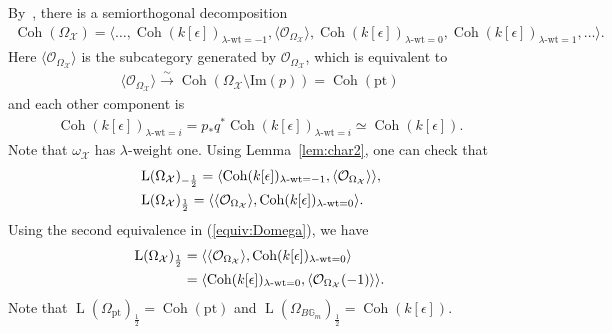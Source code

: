 \documentclass [11pt,oneside,a4paper,mathscr]{amsart}
\theoremstyle{definition}
\newcommand{\LL}{\operatorname{L}}
\newcommand{\X}{\mathcal{X}}
\newcommand{\bgm}{B\mathbb{G}_m}
\newcommand{\Coh}{\operatorname{Coh}}
\newcommand{\wt}{\mathrm{wt}}
\begin{document}
By~\cite[Theorem~3.3.1]{HalpK32}, 
there is a semiorthogonal decomposition 
\begin{align*}
    \Coh(\Omega_{\X})=\langle \ldots, \Coh(k[\epsilon])_{\lambda\text{-}\wt=-1}, \langle \mathcal{O}_{\Omega_{\X}} \rangle,  \Coh(k[\epsilon])_{\lambda\text{-}\wt=0}, \Coh(k[\epsilon])_{\lambda\text{-}\wt=1}, \ldots\rangle. 
\end{align*}
Here $\langle\mathcal{O}_{\Omega_{\X}} \rangle$ is the subcategory generated by $\mathcal{O}_{\Omega_{\X}}$, which 
is equivalent to 
\begin{align*}
\langle\mathcal{O}_{\Omega_{\X}}\rangle \stackrel{\sim}{\to} \Coh(\Omega_{\X} \setminus \mathrm{Im}(p)) 
=\Coh(\mathrm{pt})
\end{align*}
and each other component is
\begin{align*}
    \Coh(k[\epsilon])_{\lambda\text{-}\wt=i}=p_{*}q^* \Coh(k[\epsilon])_{\lambda\text{-}\wt=i}
    \simeq \Coh(k[\epsilon]). 
\end{align*}
Note that $\omega_{\X}$ has $\lambda$-weight one. 
Using Lemma~\ref{lem:char2}, 
one can check that 
\begin{align}\label{check:L}
&\LL(\Omega_{\X})_{-\frac{1}{2}}
    =\langle \Coh(k[\epsilon])_{\lambda\text{-}\wt=-1}, 
    \langle\mathcal{O}_{\Omega_{\X}} \rangle \rangle, \\ \notag
&\LL(\Omega_{\X})_{\frac{1}{2}}
    =\langle \langle \mathcal{O}_{\Omega_{\X}} \rangle,  \Coh(k[\epsilon])_{\lambda\text{-}\wt=0} \rangle.
\end{align}
Using the second equivalence in (\ref{equiv:Domega}), we have 
\begin{align}
    \label{sod:LA1}
    \LL(\Omega_{\X})_{\frac{1}{2}}&=\langle \langle \mathcal{O}_{\Omega_{\X}}\rangle, \Coh(k[\epsilon])_{\lambda\text{-}\wt=0}\rangle \\
   \notag &=\langle \Coh(k[\epsilon])_{\lambda\text{-}\wt=0}, \langle \mathcal{O}_{\Omega_{\X}}(-1)\rangle\rangle.
\end{align}
Note that $\LL(\Omega_{\mathrm{pt}})_{\frac{1}{2}}=\Coh(\mathrm{pt})$
and $\LL(\Omega_{\bgm})_{\frac{1}{2}}=\Coh(k[\epsilon])$. 
\end{document}

